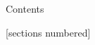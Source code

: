 \documentclass[../quali_slides.tex]{subfiles}
\begin{document}
	
	\begin{frame}{Contents}
		
		[sections numbered]
		\tableofcontents[hideallsubsections]
		
	\end{frame}
\end{document}
